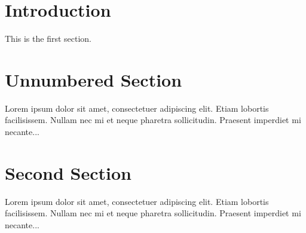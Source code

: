 \documentclass[11pt]{article}
\begin{document}
\section{Introduction} \label{Introduction}
 
This is the first section.

\section*{Unnumbered Section}
 
Lorem ipsum dolor sit amet, consectetuer adipiscing elit.  
Etiam lobortis facilisissem.  Nullam nec mi et neque pharetra 
sollicitudin.  Praesent imperdiet mi necante...
 
\section{Second Section}
 
Lorem ipsum dolor sit amet, consectetuer adipiscing elit.  
Etiam lobortis facilisissem.  Nullam nec mi et neque pharetra 
sollicitudin.  Praesent imperdiet mi necante...
\end{document}
